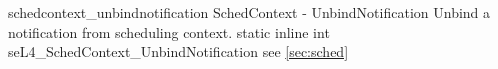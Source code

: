 %
%
%
%

\apidoc
{schedcontext_unbindnotification}
{SchedContext - UnbindNotification}
{Unbind a notification from scheduling context.} 
{static inline int seL4\_SchedContext\_UnbindNotification}
{
}
{\errorenumdesc}
{see \autoref{sec:sched}}
